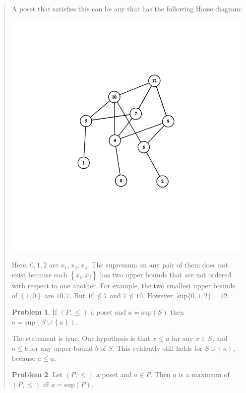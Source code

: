 \documentclass[a4paper, 12pt]{article}
\theoremstyle{definition}
\newtheorem{problem}{Problem}
\theoremstyle{definition}
\theoremstyle{definition}
\begin{document}
\begin{quote}
A poset that satisfies this can be any that has the following Hasse diagram:

\begin{center}
\includegraphics[scale=0.3]{graph}
\end{center}

Here, $0, 1, 2$ are $x_1, x_2, x_3$. The supremum on any pair of them does not
exist because each $\left\{ x_i, x_j \right\} $ has two upper bounds that are
not ordered with respect to one another. For example, the two smallest upper
bounds of $\left\{ 1, 0 \right\} $ are $10, 7$. But $10 \not\leq 7$ and $7
\not\leq 10$. However, $\text{sup}\{0, 1, 2\} = 12 $.

\begin{problem}
    If $(P, \leq) $ a poset and $a = \text{sup}(S)$ then $a = \text{sup}(S \cup
    \left\{ a \right\} )$.
\end{problem}

The statement is true. Our hypothesis is that $x \leq a$ for any $x \in S$, and $a
\leq b$ for any upper-bound $b$ of $S$. This evidently still holds for $S \cup
\left\{ a \right\} $, because $a \leq a$.

\begin{problem}
    Let $(P, \leq) $ a poset and $a \in P$. Then $a$ is a maximum of $(P, \leq)
    $ iff $a = \text{sup}(P) $.
\end{problem}


\end{quote}
\end{document}
